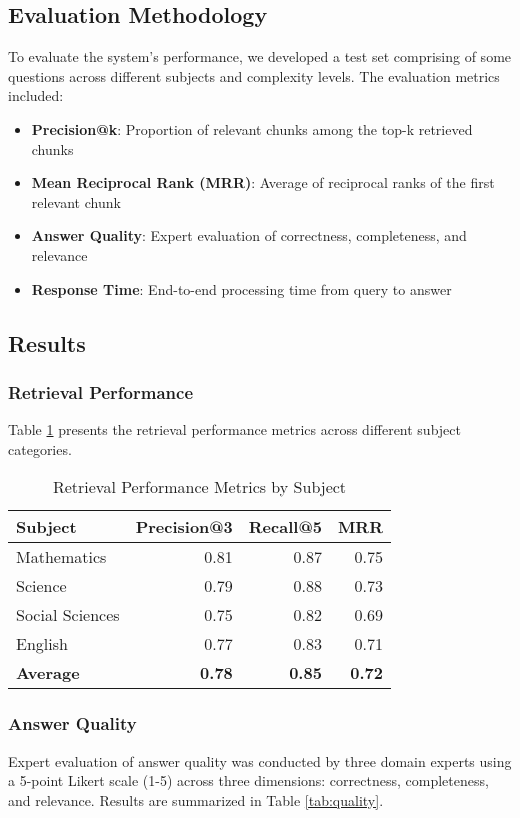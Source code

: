 \documentclass[10pt,conference]{IEEEtran}
\begin{document}
\subsection{Evaluation Methodology}
To evaluate the system's performance, we developed a test set comprising of some questions across different subjects and complexity levels. The evaluation metrics included:

\begin{itemize}
    \item \textbf{Precision@k}: Proportion of relevant chunks among the top-k retrieved chunks
    \item \textbf{Mean Reciprocal Rank (MRR)}: Average of reciprocal ranks of the first relevant chunk
    \item \textbf{Answer Quality}: Expert evaluation of correctness, completeness, and relevance
    \item \textbf{Response Time}: End-to-end processing time from query to answer
\end{itemize}

\subsection{Results}
\subsubsection{Retrieval Performance}
Table \ref{tab:retrieval} presents the retrieval performance metrics across different subject categories.

\begin{table}[h]
\centering
\caption{Retrieval Performance Metrics by Subject}
\label{tab:retrieval}
\begin{tabular}{lrrr}
\toprule
\textbf{Subject} & \textbf{Precision@3} & \textbf{Recall@5} & \textbf{MRR} \\
\midrule
Mathematics & 0.81 & 0.87 & 0.75 \\
Science & 0.79 & 0.88 & 0.73 \\
Social Sciences & 0.75 & 0.82 & 0.69 \\
English & 0.77 & 0.83 & 0.71 \\
\midrule
\textbf{Average} & \textbf{0.78} & \textbf{0.85} & \textbf{0.72} \\
\bottomrule
\end{tabular}
\end{table}

\subsubsection{Answer Quality}
Expert evaluation of answer quality was conducted by three domain experts using a 5-point Likert scale (1-5) across three dimensions: correctness, completeness, and relevance. Results are summarized in Table \ref{tab:quality}.
\end{document}
